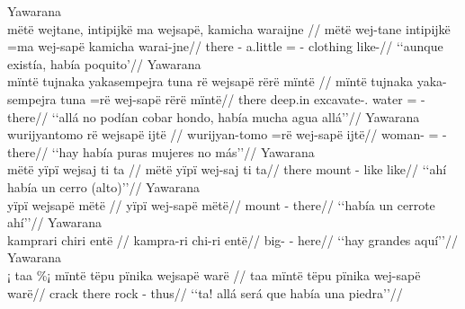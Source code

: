 \documentclass{memoir}
\begin{document}
\pex\label{ex-main-aff-part-cop-nsubj}    \a Yawarana\\
    \label{convcosnoind-49}        \begingl
        \glpreamble mëtë wejtane, intipijkë ma wejsapë, kamicha waraijne //
        \gla mëtë wej-tane intipijkë =ma wej-sapë kamicha warai-jne//
        \glb there - a.little = - clothing like-//
            \glft ‘‘aunque existía, había poquito’//  
        \endgl 
    \a Yawarana\\
    \label{convfemgrme-284}        \begingl
        \glpreamble mïntë tujnaka yakasempejra tuna rë wejsapë rërë mïntë //
        \gla mïntë tujnaka yaka-sempejra tuna =rë wej-sapë rërë mïntë//
        \glb there deep.in excavate-. water = -  there//
            \glft ‘‘allá no podían cobar hondo, había mucha agua allá’’//  
        \endgl 
    \a Yawarana\\
    \label{conv1stenc-123}        \begingl
        \glpreamble wurijyantomo rë wejsapë ijtë //
        \gla wurijyan-tomo =rë wej-sapë ijtë//
        \glb woman- = - there//
            \glft ‘‘hay había puras mujeres no más’’//  
        \endgl 
    \a Yawarana\\
    \label{ctovarmafl-354}        \begingl
        \glpreamble mëtë yïpï wejsaj ti ta //
        \gla mëtë yïpï wej-saj ti ta//
        \glb there mount - like like//
            \glft ‘‘ahí había un cerro (alto)’’//  
        \endgl 
    \a Yawarana\\
    \label{ctovarmafl-355}        \begingl
        \glpreamble yïpï wejsapë mëtë //
        \gla yïpï wej-sapë mëtë//
        \glb mount - there//
            \glft ‘‘había un cerrote ahí’’//  
        \endgl 
    \a Yawarana\\
    \label{ctovarmafl-453}        \begingl
        \glpreamble kamprari chiri entë //
        \gla kampra-ri chi-ri entë//
        \glb big- - here//
            \glft ‘‘hay grandes aquí’’//  
        \endgl 
    \a Yawarana\\
    \label{histpajirdi-120}        \begingl
        \glpreamble ¡ taa \%¡ mïntë tëpu pïnika wejsapë warë //
        \gla taa mïntë tëpu pïnika wej-sapë warë//
        \glb crack there rock  - thus//
            \glft ‘‘ta! allá será que había una piedra’’//  
        \endgl 
\xe
\end{document}
